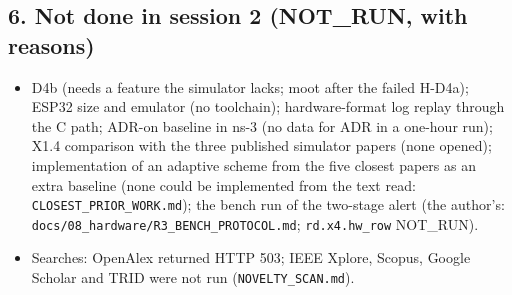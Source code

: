 \subsection*{6. Not done in session 2 (NOT\_RUN, with reasons)}

\begin{itemize}
\item D4b (needs a feature the simulator lacks; moot after the failed H-D4a); ESP32 size and emulator (no toolchain); hardware-format log replay through the C path; ADR-on baseline in ns-3 (no data for ADR in a one-hour run); X1.4 comparison with the three published simulator papers (none opened); implementation of an adaptive scheme from the five closest papers as an extra baseline (none could be implemented from the text read: \texttt{CLOSEST\_PRIOR\_WORK.md}); the bench run of the two-stage alert (the author's: \texttt{docs/08\_hardware/R3\_BENCH\_PROTOCOL.md}; \texttt{rd.x4.hw\_row} NOT\_RUN).
\item Searches: OpenAlex returned HTTP 503; IEEE Xplore, Scopus, Google Scholar and TRID were not run (\texttt{NOVELTY\_SCAN.md}).
\end{itemize}

